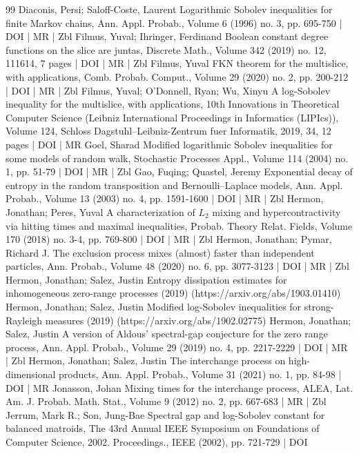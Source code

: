 \begin{thebibliography}{99}
Diaconis, Persi; Saloff-Coste, Laurent Logarithmic Sobolev inequalities for finite Markov chains, Ann. Appl. Probab., Volume 6 (1996) no. 3, pp. 695-750 | DOI | MR | Zbl
Filmus, Yuval; Ihringer, Ferdinand Boolean constant degree functions on the slice are juntas, Discrete Math., Volume 342 (2019) no. 12, 111614, 7 pages | DOI | MR | Zbl
Filmus, Yuval FKN theorem for the multislice, with applications, Comb. Probab. Comput., Volume 29 (2020) no. 2, pp. 200-212 | DOI | MR | Zbl
Filmus, Yuval; O’Donnell, Ryan; Wu, Xinyu A log-Sobolev inequality for the multislice, with applications, 10th Innovations in Theoretical Computer Science (Leibniz International Proceedings in Informatics (LIPIcs)), Volume 124, Schloss Dagstuhl–Leibniz-Zentrum fuer Informatik, 2019, 34, 12 pages | DOI | MR
Goel, Sharad Modified logarithmic Sobolev inequalities for some models of random walk, Stochastic Processes Appl., Volume 114 (2004) no. 1, pp. 51-79 | DOI | MR | Zbl
Gao, Fuqing; Quastel, Jeremy Exponential decay of entropy in the random transposition and Bernoulli–Laplace models, Ann. Appl. Probab., Volume 13 (2003) no. 4, pp. 1591-1600 | DOI | MR | Zbl
Hermon, Jonathan; Peres, Yuval A characterization of ${L}_2$ mixing and hypercontractivity via hitting times and maximal inequalities, Probab. Theory Relat. Fields, Volume 170 (2018) no. 3-4, pp. 769-800 | DOI | MR | Zbl
Hermon, Jonathan; Pymar, Richard J. The exclusion process mixes (almost) faster than independent particles, Ann. Probab., Volume 48 (2020) no. 6, pp. 3077-3123 | DOI | MR | Zbl
Hermon, Jonathan; Salez, Justin Entropy dissipation estimates for inhomogeneous zero-range processes (2019) (https://arxiv.org/abs/1903.01410)
Hermon, Jonathan; Salez, Justin Modified log-Sobolev inequalities for strong-Rayleigh measures (2019) (https://arxiv.org/abs/1902.02775)
Hermon, Jonathan; Salez, Justin A version of Aldous’ spectral-gap conjecture for the zero range process, Ann. Appl. Probab., Volume 29 (2019) no. 4, pp. 2217-2229 | DOI | MR | Zbl
Hermon, Jonathan; Salez, Justin The interchange process on high-dimensional products, Ann. Appl. Probab., Volume 31 (2021) no. 1, pp. 84-98 | DOI | MR
Jonasson, Johan Mixing times for the interchange process, ALEA, Lat. Am. J. Probab. Math. Stat., Volume 9 (2012) no. 2, pp. 667-683 | MR | Zbl
Jerrum, Mark R.; Son, Jung-Bae Spectral gap and log-Sobolev constant for balanced matroids, The 43rd Annual IEEE Symposium on Foundations of Computer Science, 2002. Proceedings., IEEE (2002), pp. 721-729 | DOI

\end{thebibliography}
